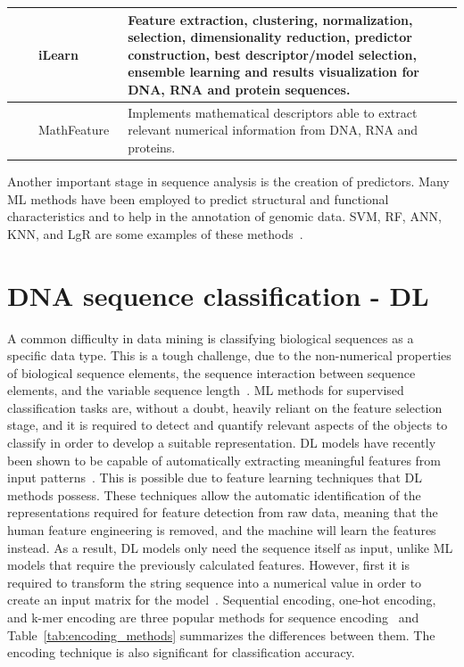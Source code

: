\begin{table}[ht]
\begin{tabular}{lp{2cm}p{3.5cm}p{7cm}}
	\citeyear{Chen2019ILearn:Data} & \citeauthor{Chen2019ILearn:Data} & iLearn~\cite{Chen2019ILearn:Data} & Feature extraction, clustering, normalization, selection, dimensionality reduction, predictor construction, best descriptor/model selection, ensemble learning and results visualization for \gls{DNA}, \gls{RNA} and protein sequences.\\\midrule
	
	\citeyear{Bonidia2021MathFeature:Descriptors} & \citeauthor{Bonidia2021MathFeature:Descriptors} & MathFeature~\cite{Bonidia2021MathFeature:Descriptors} & Implements mathematical descriptors able to extract relevant numerical information from \gls{DNA}, \gls{RNA} and proteins.\\
    
	\bottomrule
\end{tabular}
\end{table}

Another important stage in sequence analysis is the creation of predictors. Many \gls{ML} methods have been employed to predict structural and functional characteristics and to help in the annotation of genomic data. \gls{SVM}, \gls{RF}, \gls{ANN}, \gls{KNN}, and \gls{LgR} are some examples of these methods~\cite{Chen2019ILearn:Data}.



\section{DNA sequence classification - DL}

A common difficulty in data mining is classifying biological sequences as a specific data type. This is a tough challenge, due to the non-numerical properties of biological sequence elements, the sequence interaction between sequence elements, and the variable sequence length~\cite{Yang2020ReviewDNA}. \gls{ML} methods for supervised classification tasks are, without a doubt, heavily reliant on the feature selection stage, and it is required to detect and quantify relevant aspects of the objects to classify in order to develop a suitable representation. \gls{DL} models have recently been shown to be capable of automatically extracting meaningful features from input patterns~\cite{LoBosco2017DeepClassification}. This is possible due to feature learning techniques that \gls{DL} methods possess. These techniques allow the automatic identification of the representations required for feature detection from raw data, meaning that the human feature engineering is removed, and the machine will learn the features instead. As a result, \gls{DL} models only need the sequence itself as input, unlike \gls{ML} models that require the previously calculated features. However, first it is required to transform the string sequence into a numerical value in order to create an input matrix for the model~\cite{Yang2020ReviewDNA}. Sequential encoding, one-hot encoding, and k-mer encoding are three popular methods for sequence encoding~\cite{Choong2017EvaluationMethod} and Table~\ref{tab:encoding_methods} summarizes the differences between them. The encoding technique is also significant for classification accuracy.

